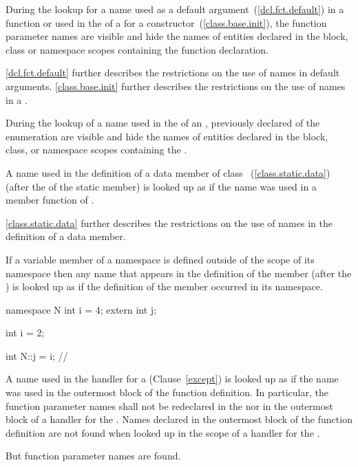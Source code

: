 \pnum
During the lookup for a name used as a default
argument~(\ref{dcl.fct.default}) in a function
 or used in the
 of a  for a
constructor~(\ref{class.base.init}), the function parameter names are
visible and hide the names of entities declared in the block, class or
namespace scopes containing the function declaration. \begin{note}
\ref{dcl.fct.default} further describes the restrictions on the use of
names in default arguments. \ref{class.base.init} further describes the
restrictions on the use of names in a .
\end{note}

\pnum
During the lookup of a name used in the
 of an ,
previously declared  of the enumeration are visible
and hide the names of entities declared in the block, class, or namespace
scopes containing the .

\pnum
A name used in the definition of a  data member of class
~(\ref{class.static.data}) (after the 
of the static member) is looked up as if the name was used in a member
function of . \begin{note} \ref{class.static.data} further
describes the restrictions on the use of names in the definition of a
 data member. \end{note}

\pnum
If a variable member of a namespace is defined outside of the scope of
its namespace then any name that appears in the definition of the
member (after the ) is looked up as if the
definition of the member occurred in its namespace.
\begin{example}

\begin{codeblock}
namespace N {
  int i = 4;
  extern int j;
}

int i = 2;

int N::j = i;       // 
\end{codeblock}
\end{example}

\pnum
A name used in the handler for a 
(Clause~\ref{except}) is looked up as if the name was used in the
outermost block of the function definition. In particular, the function
parameter names shall not be redeclared in the
 nor in the outermost block of a handler
for the . Names declared in the outermost
block of the function definition are not found when looked up in the
scope of a handler for the . \begin{note} But
function parameter names are found. \end{note}

